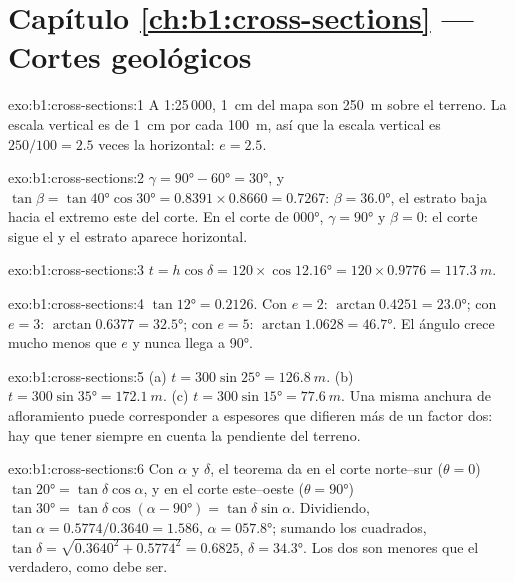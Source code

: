 \section*{Capítulo \ref{ch:b1:cross-sections} --- Cortes geológicos}

\begin{solution}{exo:b1:cross-sections:1}
A 1:25\,000, \qty{1}{cm} del mapa son \qty{250}{m} sobre el terreno. La escala vertical es de
\qty{1}{cm} por cada \qty{100}{m}, así que la escala vertical es
$250/100 = 2.5$ veces la horizontal: $e = 2.5$.
\end{solution}

\begin{solution}{exo:b1:cross-sections:2}
$\gamma = \ang{90} - \ang{60} = \ang{30}$, y $\tan\beta = \tan\ang{40}
\cos\ang{30} = 0.8391\times0.8660 = 0.7267$: $\beta = \ang{36.0}$, el estrato
baja hacia el extremo este del corte. En el corte de 
\ang{000}, $\gamma = \ang{90}$ y $\beta = 0$: el corte sigue el  y el estrato
aparece horizontal.
\end{solution}

\begin{solution}{exo:b1:cross-sections:3}
$t = h\cos\delta = 120\times\cos\ang{12.16} = 120\times0.9776 =
\qty{117.3}{m}$.
\end{solution}

\begin{solution}{exo:b1:cross-sections:4}
$\tan\ang{12} = 0.2126$. Con $e = 2$: $\arctan 0.4251 = \ang{23.0}$; con
$e = 3$: $\arctan 0.6377 = \ang{32.5}$; con $e = 5$: $\arctan 1.0628 =
\ang{46.7}$. El ángulo crece mucho menos que $e$ y nunca llega a \ang{90}.
\end{solution}

\begin{solution}{exo:b1:cross-sections:5}
(a) $t = 300\sin\ang{25} = \qty{126.8}{m}$. (b) $t = 300\sin\ang{35} =
\qty{172.1}{m}$. (c) $t = 300\sin\ang{15} = \qty{77.6}{m}$. Una misma anchura de afloramiento
puede corresponder a espesores que difieren más de un factor dos: hay que tener siempre en cuenta
la pendiente del terreno.
\end{solution}

\begin{solution}{exo:b1:cross-sections:6}
Con  $\alpha$ y  $\delta$, el teorema da en el corte norte--sur
($\theta = 0$) $\tan\ang{20} = \tan\delta\cos\alpha$, y en el corte este--oeste
($\theta = \ang{90}$) $\tan\ang{30} =
\tan\delta\cos(\alpha - \ang{90}) = \tan\delta\sin\alpha$. Dividiendo,
$\tan\alpha = 0.5774/0.3640 = 1.586$, $\alpha = \ang{057.8}$; sumando los cuadrados,
$\tan\delta = \sqrt{0.3640^2 + 0.5774^2} = 0.6825$, $\delta =
\ang{34.3}$. Los dos  son menores que el verdadero, como debe ser.
\end{solution}

